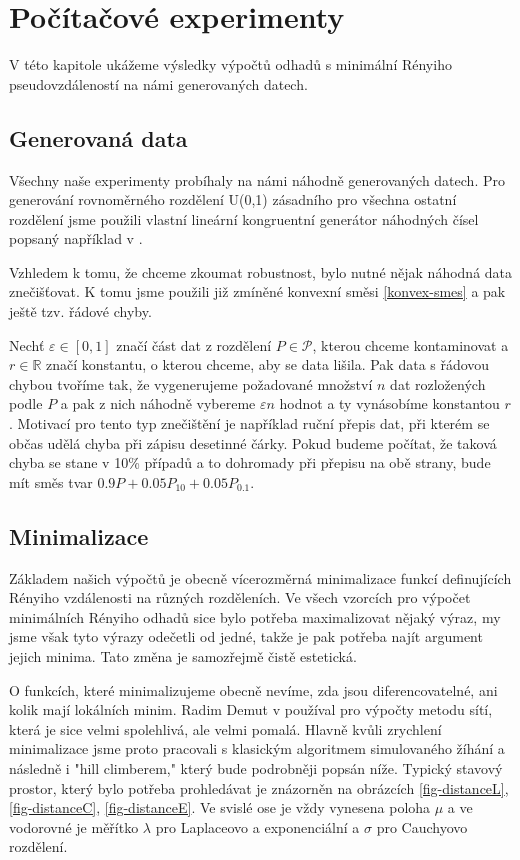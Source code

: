 \chapter{Počítačové experimenty}

V této kapitole ukážeme výsledky výpočtů odhadů s minimální Rényiho pseudovzdáleností na námi generovaných datech. 

\section{Generovaná data}
Všechny naše experimenty probíhaly na námi náhodně generovaných datech. Pro generování rovnoměrného rozdělení U(0,1) zásadního pro všechna ostatní rozdělení jsme použili vlastní lineární kongruentní generátor náhodných čísel popsaný například v \cite{Virius98}. 

Vzhledem k tomu, že chceme zkoumat robustnost, bylo nutné nějak  náhodná data znečišťovat. K tomu jsme použili již zmíněné konvexní směsi \eqref{konvex-smes} a pak ještě tzv. řádové chyby. 

Nechť $\varepsilon \in [0,1]$ značí část dat z rozdělení $P \in \mathcal{P}$, kterou chceme kontaminovat a $r \in \mathbb{R}$ značí konstantu, o kterou chceme, aby se data lišila. Pak data s řádovou chybou tvoříme tak, že vygenerujeme požadované množství $n$ dat rozložených podle $P$ a pak z nich náhodně vybereme $\varepsilon n$ hodnot a ty vynásobíme konstantou $r$. Motivací pro tento typ znečištění je například ruční přepis dat, při kterém se občas udělá chyba při zápisu desetinné čárky. Pokud budeme počítat, že taková chyba se stane v 10\% případů a to dohromady při přepisu na obě strany, bude mít směs tvar $0.9P + 0.05P_{10} + 0.05P_{0.1}$.

\section{Minimalizace}
Základem našich výpočtů je obecně vícerozměrná minimalizace funkcí definujících Rényiho vzdálenosti na různých rozděleních. Ve všech vzorcích pro výpočet minimálních Rényiho odhadů sice bylo potřeba maximalizovat nějaký výraz, my jsme však tyto výrazy odečetli od jedné, takže je pak potřeba najít argument jejich minima. Tato změna je samozřejmě čistě estetická.

O funkcích, které minimalizujeme obecně nevíme, zda jsou diferencovatelné, ani kolik mají lokálních minim. Radim Demut v \cite{Demut2010} používal pro výpočty metodu sítí, která je sice velmi spolehlivá, ale velmi pomalá. Hlavně kvůli zrychlení minimalizace jsme proto pracovali s klasickým algoritmem simulovaného žíhání a následně i "hill climberem," který bude podrobněji popsán níže. Typický stavový prostor, který bylo potřeba prohledávat je znázorněn na obrázcích \ref{fig-distanceL}, \ref{fig-distanceC}, \ref{fig-distanceE}. Ve svislé ose je vždy vynesena poloha $\mu$ a ve vodorovné je měřítko $\lambda$ pro Laplaceovo a exponenciální a $\sigma$ pro Cauchyovo rozdělení.

